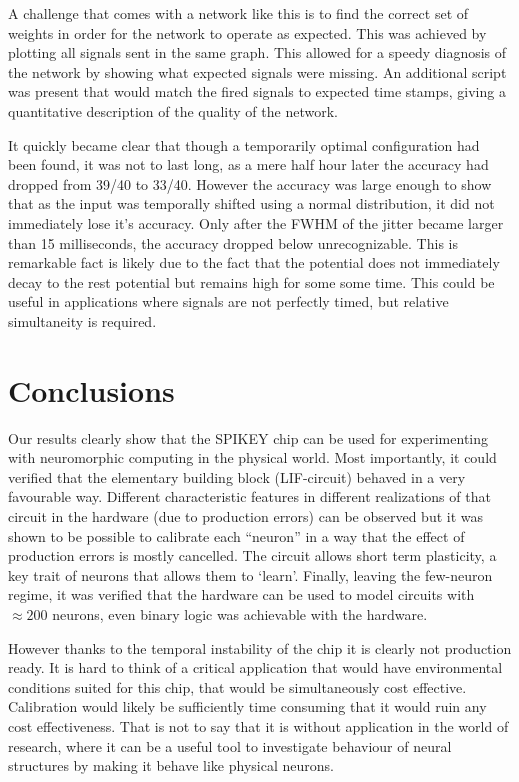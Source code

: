 \documentclass[a4paper,twocolumn]{article}
\begin{document}
A challenge that comes with a network like this is to find the correct set of
weights in order for the network to operate as expected. This was achieved by
plotting all signals sent in the same graph. This allowed for a speedy diagnosis
of the network by showing what expected signals were missing. An additional
script was present that would match the fired signals to expected time stamps,
giving a quantitative description of the quality of the network.

It quickly became clear that though a temporarily optimal configuration had been
found, it was not to last long, as a mere half hour later the accuracy had
dropped from 39/40 to 33/40. However the accuracy was large enough to show that
as the input was temporally shifted using a normal distribution, it did not
immediately lose it's accuracy. Only after the FWHM of the jitter became larger
than 15 milliseconds, the accuracy dropped below unrecognizable. This is
remarkable fact is likely due to the fact that the potential does not
immediately decay to the rest potential but remains high for some some time.
This could be useful in applications where signals are not perfectly timed, but
relative simultaneity is required.

\section{Conclusions}
Our results clearly show that the SPIKEY chip can be used for experimenting with
neuromorphic computing in the physical world. Most importantly, it could
verified that the elementary building block (LIF-circuit) behaved in a very
favourable way. Different characteristic features in different realizations of
that circuit in the hardware (due to production errors) can be observed but it
was shown to be possible to calibrate each  ``neuron'' in a way that the effect
of production errors is mostly cancelled. The circuit allows short term
plasticity,  a key trait of neurons that allows them to `learn'.  Finally,
leaving the few-neuron regime, it was verified that the hardware can be used to
model circuits with $\approx 200$ neurons, even binary logic was achievable with
the hardware.

However thanks to the temporal instability of the chip it is clearly not
production ready. It is hard to think of a critical application that would have
environmental conditions suited for this chip, that would be simultaneously cost
effective. Calibration would likely be sufficiently time consuming that it would
ruin any cost effectiveness. That is not to say that it is without application
in the world of research, where it can be a useful tool to investigate behaviour
of neural structures by making it behave like physical neurons.
\end{document}
